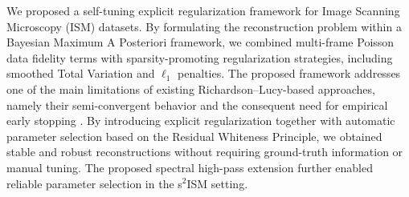 \documentclass[letterpaper]{article}
\begin{document}





We proposed a self-tuning explicit regularization framework for Image Scanning Microscopy (ISM) datasets. By formulating the reconstruction problem within a Bayesian Maximum A Posteriori framework, we combined multi-frame Poisson data fidelity terms with sparsity-promoting regularization strategies, including smoothed Total Variation and $\ell_1$ penalties. The proposed framework addresses one of the main limitations of existing Richardson–Lucy-based approaches, namely their semi-convergent behavior and the consequent need for empirical early stopping \cite{Liu}. By introducing explicit regularization together with automatic parameter selection based on the Residual Whiteness Principle, we obtained stable and robust reconstructions without requiring ground-truth information or manual tuning. The proposed spectral high-pass extension further enabled reliable parameter selection in the s$^2$ISM setting.
\end{document}
